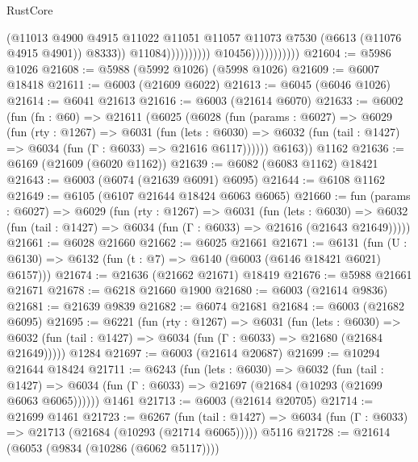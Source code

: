 \begin{lexlean}{RustCore}
\begin{coremodule}
                                                (@11013
                                                  @4900
                                                  @4915
                                                  @11022
                                                  @11051
                                                  @11057
                                                  @11073
                                                  @7530
                                                  (@6613 (@11076 @4915 @4901))
                                                  @8333))
                                              @11084))))))))))
                          @10456)))))))))))
@21604 := @5986 @1026
@21608 := @5988 (@5992 @1026) (@5998 @1026)
@21609 := @6007 @18418
@21611 := @6003 (@21609 @6022)
@21613 := @6045 (@6046 @1026)
@21614 := @6041 @21613
@21616 := @6003 (@21614 @6070)
@21633 := @6002
    (fun (fn : @60) =>
    @21611
      (@6025
        (@6028
          (fun (params : @6027) =>
          @6029
            (fun (rty : @1267) =>
            @6031
              (fun (lets : @6030) =>
              @6032 (fun (tail : @1427) => @6034 (fun (Γ : @6033) => @21616 @6117))))))
        @6163))
    @1162
@21636 := @6169 (@21609 (@6020 @1162))
@21639 := @6082 (@6083 @1162) @18421
@21643 := @6003 (@6074 (@21639 @6091) @6095)
@21644 := @6108 @1162
@21649 := @6105 (@6107 @21644 @18424 @6063 @6065)
@21660 := fun (params : @6027) =>
  @6029
    (fun (rty : @1267) =>
    @6031
      (fun (lets : @6030) =>
      @6032 (fun (tail : @1427) => @6034 (fun (Γ : @6033) => @21616 (@21643 @21649)))))
@21661 := @6028 @21660
@21662 := @6025 @21661
@21671 := @6131
    (fun (U : @6130) => @6132 (fun (t : @7) => @6140 (@6003 (@6146 @18421 @6021) @6157)))
@21674 := @21636 (@21662 @21671) @18419
@21676 := @5988 @21661 @21671
@21678 := @6218 @21660 @1900
@21680 := @6003 (@21614 @9836)
@21681 := @21639 @9839
@21682 := @6074 @21681
@21684 := @6003 (@21682 @6095)
@21695 := @6221
    (fun (rty : @1267) =>
    @6031
      (fun (lets : @6030) =>
      @6032 (fun (tail : @1427) => @6034 (fun (Γ : @6033) => @21680 (@21684 @21649)))))
    @1284
@21697 := @6003 (@21614 @20687)
@21699 := @10294 @21644 @18424
@21711 := @6243
    (fun (lets : @6030) =>
    @6032
      (fun (tail : @1427) =>
      @6034 (fun (Γ : @6033) => @21697 (@21684 (@10293 (@21699 @6063 @6065))))))
    @1461
@21713 := @6003 (@21614 @20705)
@21714 := @21699 @1461
@21723 := @6267
    (fun (tail : @1427) => @6034 (fun (Γ : @6033) => @21713 (@21684 (@10293 (@21714 @6065)))))
    @5116
@21728 := @21614 (@6053 (@9834 (@10286 (@6062 @5117))))

\end{coremodule}
\end{lexlean}
